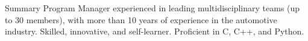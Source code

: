 
\summary
    {Summary}
    {Program Manager experienced in leading multidisciplinary teams (up to 30 members), with more than 10 years of experience in the automotive industry. Skilled, innovative, and self-learner. Proficient in C, C++, and Python.}

